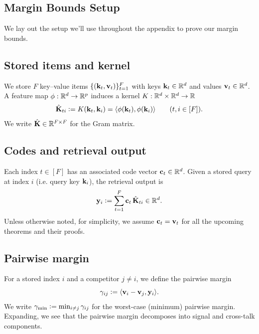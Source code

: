 \newcommand{\vX}{\mathbf{X}}
\newcommand{\vY}{\mathbf{Y}}

\renewcommand{\paragraph}[1]{\par\medskip\noindent\textbf{#1}\enspace}

\newpage

\subsection{Margin Bounds Setup}
\label{app:theory:margin_bounds}
We lay out the setup we'll use throughout the appendix to prove our margin bounds.
\subsection*{Stored items and kernel}
We store $F$ key--value items $\{({\mathbf{k}}_{t},{\mathbf{v}}_{t})\}_{t=1}^F$ with keys ${\mathbf{k}}_{t}\in\mathbb{R}^d$ and values ${\mathbf{v}}_{t}\in\mathbb{R}^d$.
A feature map $\phi:\mathbb{R}^d\to\mathbb{R}^p$ induces a kernel $K:\mathbb{R}^d\times \mathbb{R}^d \to \mathbb{R}$
\[
\hat{\mathbf{K}}_{ti} \vcentcolon= K({\mathbf{k}}_{t}, {\mathbf{k}}_{i})=\langle {\phi({\mathbf{k}}_{t})}, {\phi({\mathbf{k}}_{i})} \rangle\qquad (t,i\in[F]).
\]
We write $\hat{\mathbf{K}}\in\mathbb{R}^{F\times F}$ for the Gram matrix.

\subsection*{Codes and retrieval output}
Each index $t\in[F]$ has an associated code vector ${\mathbf{c}}_{t}\in\mathbb{R}^{d}$.
Given a stored query at index $i$ (i.e. query key ${\mathbf{k}}_{i}$), the retrieval output is
\begin{equation}
 {\mathbf{y}}_{i} \vcentcolon= \sum_{t=1}^F {\mathbf{c}}_{t}\,\hat{\mathbf{K}}_{ti}\in\mathbb{R}^{d}.
 \label{eq:yi}
\end{equation}
Unless otherwise noted, for simplicity, we assume ${\mathbf{c}}_{t}={\mathbf{v}}_{t}$ for all the upcoming theorems and their proofs.

\subsection*{Pairwise margin}
For a stored index $i$ and a competitor $j\neq i$, we define the pairwise margin
\begin{equation}
\gamma_{ij} \vcentcolon= \langle {{\mathbf{v}}_{i}-{\mathbf{v}}_j}, {{\mathbf{y}}_i} \rangle.
\label{eq:margin}
\end{equation}
We write $\gamma_{\min}\vcentcolon=\min_{i\neq j}\gamma_{ij}$ for the worst-case (minimum) pairwise margin.
Expanding, we see that the pairwise margin decomposes into signal and cross-talk components.

